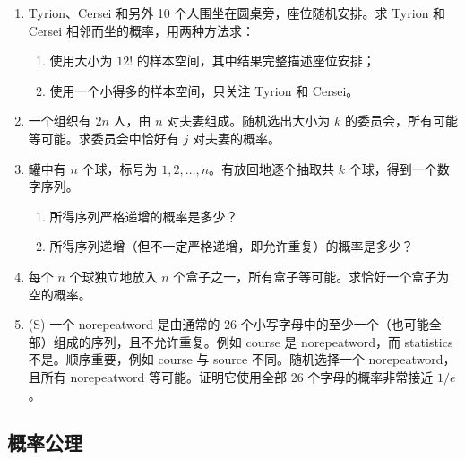 \documentclass[UTF8, 12pt, fontset=fandol, oneside]{ctexart}
\begin{document}
\begin{enumerate}
  \item Tyrion、Cersei 和另外 10 个人围坐在圆桌旁，座位随机安排。求 Tyrion 和 Cersei 相邻而坐的概率，用两种方法求：
  \begin{enumerate}
    \item 使用大小为 $12!$ 的样本空间，其中结果完整描述座位安排；
    \item 使用一个小得多的样本空间，只关注 Tyrion 和 Cersei。
  \end{enumerate}

  \item 一个组织有 $2n$ 人，由 $n$ 对夫妻组成。随机选出大小为 $k$ 的委员会，所有可能等可能。求委员会中恰好有 $j$ 对夫妻的概率。

  \item 罐中有 $n$ 个球，标号为 $1,2,\ldots,n$。有放回地逐个抽取共 $k$ 个球，得到一个数字序列。
  \begin{enumerate}
    \item 所得序列严格递增的概率是多少？
    \item 所得序列递增（但不一定严格递增，即允许重复）的概率是多少？
  \end{enumerate}

  \item 每个 $n$ 个球独立地放入 $n$ 个盒子之一，所有盒子等可能。求恰好一个盒子为空的概率。

  \item (S) 一个 norepeatword 是由通常的 26 个小写字母中的至少一个（也可能全部）组成的序列，且不允许重复。例如 course 是 norepeatword，而 statistics 不是。顺序重要，例如 course 与 source 不同。随机选择一个 norepeatword，且所有 norepeatword 等可能。证明它使用全部 26 个字母的概率非常接近 $1/e$。
\end{enumerate}

\subsection*{概率公理}
\end{document}
